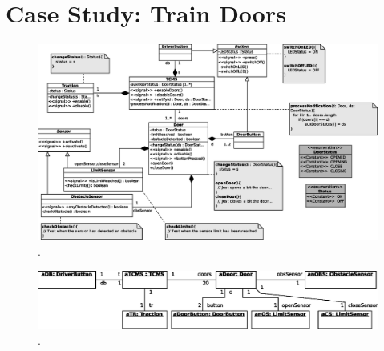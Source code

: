 \section{Case Study: Train Doors}
\label{sec:casestudy}


\begin{figure}
  \centering
  \includegraphics[width=1\columnwidth]{images/UMLClassDiagram-TrainDoors}
  \caption{.}
  \label{fig:}
\end{figure}


\begin{figure}
  \centering
  \includegraphics[width=1\columnwidth]{images/UMLObjectDiagram-TrainDoors}
  \caption{.}
  \label{fig:}
\end{figure}